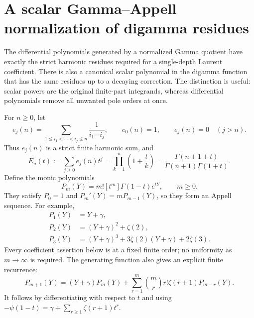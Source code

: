 \section{A scalar Gamma--Appell normalization of digamma residues}
\label{sec:scalar-gamma-normalizer}

The differential polynomials generated by a normalized Gamma quotient
have exactly the strict harmonic residues required for a single-depth
Laurent coefficient.  There is also a canonical scalar polynomial in
the digamma function that has the same residues up to a decaying
correction.  The distinction is useful: scalar powers are the original
finite-part integrands, whereas differential polynomials remove all
unwanted pole orders at once.

For $n\geq0$, let
\begin{equation}
 e_j(n)=\sum_{1\leq i_1<\cdots<i_j\leq n}
             \frac{1}{i_1\cdots i_j},
 \qquad e_0(n)=1,
 \qquad e_j(n)=0\quad(j>n).
 \label{eq:scalar-elementary-definition}
\end{equation}
Thus $e_j(n)$ is a strict finite harmonic sum, and
\begin{equation}
 E_n(t):=\sum_{j\geq0}e_j(n)t^j
   =\prod_{k=1}^{n}\left(1+\frac{t}{k}\right)
   =\frac{\Gamma(n+1+t)}{\Gamma(n+1)\Gamma(1+t)}.
 \label{eq:scalar-elementary-generator}
\end{equation}
Define the monic polynomials
\begin{equation}
 P_m(Y)=m![t^m]\Gamma(1-t)e^{tY},\qquad m\geq0.
 \label{eq:scalar-appell-definition}
\end{equation}
They satisfy $P_0=1$ and $P_m'(Y)=mP_{m-1}(Y)$, so they form an
Appell sequence.  For example,
\begin{equation}
 \begin{aligned}
 P_1(Y)&=Y+\gamma,\\
 P_2(Y)&=(Y+\gamma)^2+\zeta(2),\\
 P_3(Y)&=(Y+\gamma)^3+3\zeta(2)(Y+\gamma)+2\zeta(3).
 \end{aligned}
 \label{eq:scalar-first-polynomials}
\end{equation}
Every coefficient assertion below is at a fixed finite order; no
uniformity as $m\to\infty$ is required.
The generating function also gives an explicit finite recurrence:
\begin{equation}\label{eq:scalar-recurrence}
 P_{m+1}(Y)=(Y+\gamma)P_m(Y)
  +\sum_{r=1}^m\binom mr r!\zeta(r+1)P_{m-r}(Y).
\end{equation}
It follows by differentiating with respect to $t$ and using
$-\psi(1-t)=\gamma+\sum_{r\ge1}\zeta(r+1)t^r$.

